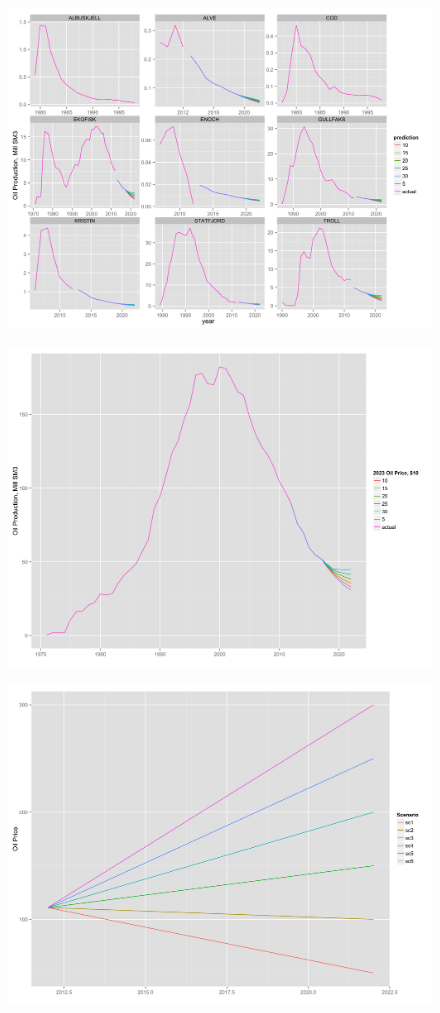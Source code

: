 \documentclass[12pt]{scrartcl} %
\begin{document}
\begin{figure}
	\includegraphics[width=.8\textwidth]{field_lev_forecast.png}
	\caption{}
	\label{field_lev_forecast}
\end{figure}

\begin{figure}
	\includegraphics[width=.8\textwidth]{tot_forecast.png}
	\caption{}
	\label{tot_forecast}
\end{figure}

\begin{figure}
	\includegraphics[width=.8\textwidth]{price_scenario.png}
	\caption{}
	\label{price_scenario}
\end{figure}
\end{document}
